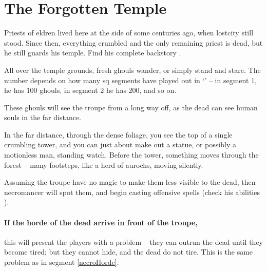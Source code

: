 \section{The Forgotten Temple}
\label{necromancers_lair}

\begin{multicols}{2}


Priests of \gls{eldren} lived here at the side of  some centuries ago, when \gls{lostcity} still stood.
Since then, everything crumbled and the only remaining priest is dead, but he still guards his temple.
Find his complete backstory .

All over the temple grounds, fresh ghouls wander, or simply stand and stare.
The number depends on how many \gls{sq} \glspl{segment} have played out in `' -- in \gls{segment} 1, he has 100 ghouls, in \gls{segment} 2 he has 200, and so on.

These ghouls will see the troupe from a long way off, as the dead can see human souls in the far distance.

\begin{boxtext}
  In the far distance, through the dense foliage, you see the top of a single crumbling tower, and you can just about make out a statue, or possibly a motionless man, standing watch.
  Before the tower, something moves through the forest -- many footsteps, like a herd of aurochs, moving silently.
\end{boxtext}

Assuming the troupe have no magic to make them less visible to the dead, then \gls{necromancer} will spot them, and begin casting offensive spells (check his abilities ).

\paragraph{If the horde of the dead arrive in front of the troupe,}
this will present the players with a problem -- they can outrun the dead until they become tired; but they cannot hide, and the dead do not tire.
This is the same problem as in \gls{segment} \vref{necroHorde}.


\end{multicols}
